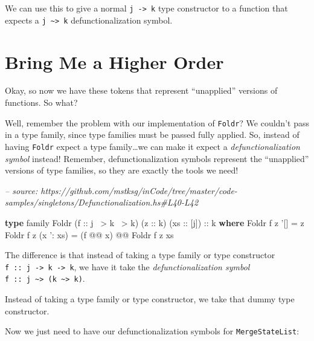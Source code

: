 \documentclass[]{article}
\newenvironment{Shaded}{}{}
\newcommand{\CommentTok}[1]{\textcolor[rgb]{0.38,0.63,0.69}{\textit{#1}}}
\newcommand{\DataTypeTok}[1]{\textcolor[rgb]{0.56,0.13,0.00}{#1}}
\newcommand{\FunctionTok}[1]{\textcolor[rgb]{0.02,0.16,0.49}{#1}}
\newcommand{\KeywordTok}[1]{\textcolor[rgb]{0.00,0.44,0.13}{\textbf{#1}}}
\newcommand{\NormalTok}[1]{#1}
\newcommand{\OtherTok}[1]{\textcolor[rgb]{0.00,0.44,0.13}{#1}}
\begin{document}
We can use this to give a normal \texttt{j\ -\textgreater{}\ k} type constructor
to a function that expects a \texttt{j\ \textasciitilde{}\textgreater{}\ k}
defunctionalization symbol.

\hypertarget{bring-me-a-higher-order}{%
\section{Bring Me a Higher Order}\label{bring-me-a-higher-order}}

Okay, so now we have these tokens that represent ``unapplied'' versions of
functions. So what?

Well, remember the problem with our implementation of \texttt{Foldr}? We
couldn't pass in a type family, since type families must be passed fully
applied. So, instead of having \texttt{Foldr} expect a type family\ldots{}we can
make it expect a \emph{defunctionalization symbol} instead! Remember,
defunctionalization symbols represent the ``unapplied'' versions of type
families, so they are exactly the tools we need!

\begin{Shaded}
\begin{Highlighting}[]
\CommentTok{-- source: https://github.com/mstksg/inCode/tree/master/code-samples/singletons/Defunctionalization.hs#L40-L42}

\KeywordTok{type}\NormalTok{ family }\DataTypeTok{Foldr}\NormalTok{ (}\OtherTok{f ::}\NormalTok{ j }\FunctionTok{~>}\NormalTok{ k }\FunctionTok{~>}\NormalTok{ k) (}\OtherTok{z ::}\NormalTok{ k) (}\OtherTok{xs ::}\NormalTok{ [j])}\OtherTok{ ::}\NormalTok{ k }\KeywordTok{where}
    \DataTypeTok{Foldr}\NormalTok{ f z '[]       }\FunctionTok{=}\NormalTok{ z}
    \DataTypeTok{Foldr}\NormalTok{ f z (x '}\FunctionTok{:}\NormalTok{ xs) }\FunctionTok{=}\NormalTok{ (f }\FunctionTok{@@}\NormalTok{ x) }\FunctionTok{@@} \DataTypeTok{Foldr}\NormalTok{ f z xs}
\end{Highlighting}
\end{Shaded}

The difference is that instead of taking a type family or type constructor
\texttt{f\ ::\ j\ -\textgreater{}\ k\ -\textgreater{}\ k}, we have it take the
\emph{defunctionalization symbol}
\texttt{f\ ::\ j\ \textasciitilde{}\textgreater{}\ (k\ \textasciitilde{}\textgreater{}\ k)}.

Instead of taking a type family or type constructor, we take that dummy type
constructor.

Now we just need to have our defunctionalization symbols for
\texttt{MergeStateList}:
\end{document}

